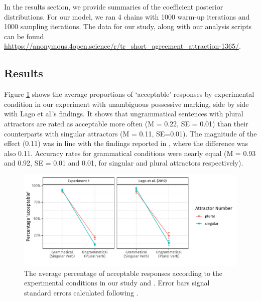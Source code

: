 \documentclass[apacite,linguex]{glossa}\usepackage[]{graphicx}\usepackage[]{color}
\makeatletter
\def\maxwidth{ %
  \ifdim\Gin@nat@width>\linewidth
    \linewidth
  \else
    \Gin@nat@width
  \fi
}
\newenvironment{knitrout}{}{} %
\makeatother
\begin{document}
In the results section, we provide summaries of the coefficient posterior distributions. For our model, we ran 4 chains with 1000 warm-up iterations and 1000 sampling iterations. The data for our study, along with our analysis scripts can be found \url{hhttps://anonymous.4open.science/r/tr_short_agreement_attraction-1365/}.


\subsection{Results}

Figure \ref{fig:AverageResponses} shows the average proportions of `acceptable' responses by experimental condition in our experiment with unambiguous possessive marking, side by side with Lago et al.'s findings. It shows that ungrammatical sentences with plural attractors are rated as acceptable more often (M = 0.22, SE = 0.01) than their counterparts with singular attractors (M = 0.11, SE=0.01). The magnitude of the effect (0.11) was in line with the findings reported in \citet{LagoEtAl:2019}, where the difference was also 0.11. Accuracy rates for grammatical conditions were nearly equal (M = 0.93 and 0.92, SE = 0.01 and 0.01, for singular and plural attractors respectively).


\begin{figure}[hbt!]
\centering

\begin{knitrout}
\color{fgcolor}

{\centering \includegraphics[width=\maxwidth]{figure/AverageResponses-1} 

}


\end{knitrout}

\caption{The average percentage of acceptable responses according to the experimental conditions in our study and \citet{LagoEtAl:2019}. Error bars signal standard errors calculated following \citet{Morey:2008,Cousineau:2005}.}
\label{fig:AverageResponses}
\end{figure}
\end{document}
